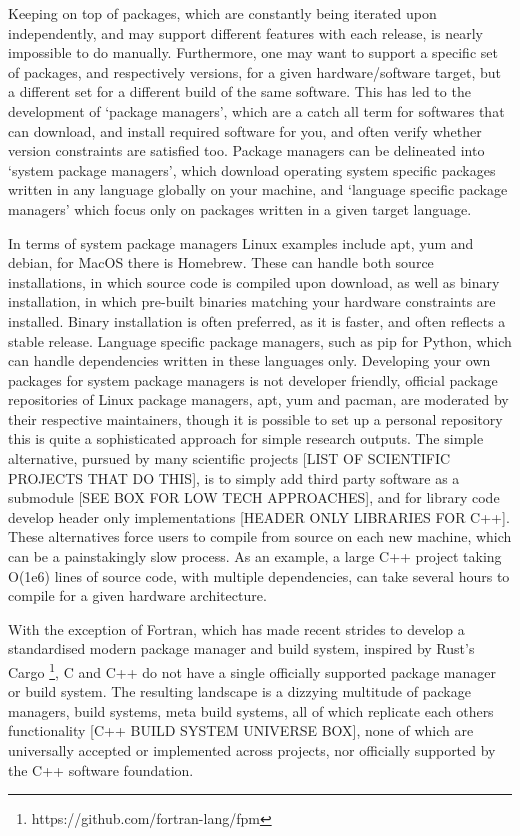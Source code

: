 Keeping on top of packages, which are constantly being iterated upon independently, and may support different features with each release, is nearly impossible to do manually. Furthermore, one may want to support a specific set of packages, and respectively versions, for a given hardware/software target, but a different set for a different build of the same software. This has led to the development of `package managers', which are a catch all term for softwares that can download, and install required software for you, and often verify whether version constraints are satisfied too. Package managers can be delineated into `system package managers', which download operating system specific packages written in any language globally on your machine, and `language specific package managers' which focus only on packages written in a given target language.

In terms of system package managers Linux examples include apt, yum and debian, for MacOS there is Homebrew. These can handle both source installations, in which source code is compiled upon download, as well as binary installation, in which pre-built binaries matching your hardware constraints are installed. Binary installation is often preferred, as it is faster, and often reflects a stable release. Language specific package managers, such as pip for Python, which can handle dependencies written in these languages only. Developing your own packages for system package managers is not developer friendly, official package repositories of Linux package managers, apt, yum and pacman, are moderated by their respective maintainers, though it is possible to set up a personal repository this is quite a sophisticated approach for simple research outputs. The simple alternative, pursued by many scientific projects [LIST OF SCIENTIFIC PROJECTS THAT DO THIS], is to simply add third party software as a submodule [SEE BOX FOR LOW TECH APPROACHES], and for library code develop header only implementations [HEADER ONLY LIBRARIES FOR C++]. These alternatives force users to compile from source on each new machine, which can be a painstakingly slow process. As an example, a large C++ project taking O(1e6) lines of source code, with multiple dependencies, can take several hours to compile for a given hardware architecture.

With the exception of Fortran, which has made recent strides to develop a standardised modern package manager and build system, inspired by Rust's Cargo \footnote{https://github.com/fortran-lang/fpm}, C and C++ do not have a single officially supported package manager or build system. The resulting landscape is a dizzying multitude of package managers, build systems, meta build systems, all of which replicate each others functionality [C++ BUILD SYSTEM UNIVERSE BOX], none of which are universally accepted or implemented across projects, nor officially supported by the C++ software foundation.

